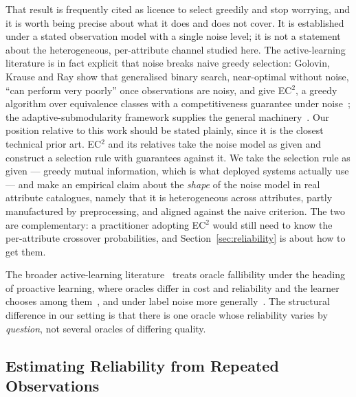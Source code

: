 That result is frequently cited as licence to select greedily and stop
worrying, and it is worth being precise about what it does and does not cover.
It is established under a stated observation model with a single noise level;
it is not a statement about the heterogeneous, per-attribute channel studied
here. The active-learning literature is in fact explicit that noise breaks
naive greedy selection: Golovin, Krause and Ray show that generalised binary
search, near-optimal without noise, ``can perform very poorly'' once
observations are noisy, and give EC$^2$, a greedy algorithm over equivalence
classes with a competitiveness guarantee under
noise~\cite{golovin2010noisy}; the adaptive-submodularity framework supplies
the general machinery~\cite{golovin2011adaptive}. Our position relative to
this work should be stated plainly, since it is the closest technical prior
art. EC$^2$ and its relatives take the noise model as given and construct a
selection rule with guarantees against it. We take the selection rule as given
--- greedy mutual information, which is what deployed systems actually use ---
and make an empirical claim about the \emph{shape} of the noise model in real
attribute catalogues, namely that it is heterogeneous across attributes,
partly manufactured by preprocessing, and aligned against the naive
criterion. The two are complementary: a practitioner adopting EC$^2$ would
still need to know the per-attribute crossover probabilities, and
Section~\ref{sec:reliability} is about how to get them.

The broader active-learning
literature~\cite{settles2009active} treats oracle fallibility under the
heading of proactive learning, where oracles differ in cost and
reliability and the learner chooses among them~\cite{donmez2008proactive}, and
under label noise more generally~\cite{frenay2014label}. The structural
difference in our setting is that there is one oracle whose reliability varies
by \emph{question}, not several oracles of differing quality.

\subsection{Estimating Reliability from Repeated Observations}

